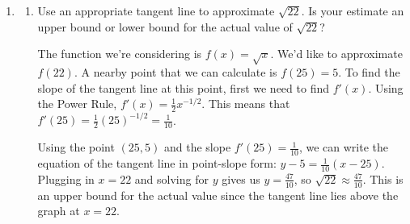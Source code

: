 \documentclass{article}
\begin{document}
\begin{enumerate}[resume, topsep=0pt]
\begin{enumerate}
    \begin{solution}
      We can differentiate this function by expanding and using the Sum, Constant Multiple,
      and Power Rules, or we can write it as $a(s)=(3s+1)(3s+1)$ and use the Product Rule.
    \end{solution}

  \item
    \begin{problem}[\stretch{0.5}]
      $b(s) = (3s + 1)^{1/2}$
    \end{problem}

    \begin{solution}
      We can't differentiate this function using the rules we've learned.
    \end{solution}

  \item
    \begin{problem}[\nstretch{0.25}]
      $c(s) = (3s + 1)^{-2}$
    \end{problem}

    \begin{solution}
      We can rewrite this function as $c(s)=\dfrac{1}{(3s+1)^2} = \dfrac{1}{9s^2 + 6s + 1}$. We can then use
      the Quotient Rule.
    \end{solution}

  \end{enumerate}

\item 

  \begin{enumerate}
  \item
    \begin{problem}[\vfill]
      Use an appropriate tangent line to approximate $\sqrt{22}$. Is your estimate an upper bound or lower bound for the actual value of $\sqrt{22}$?
    \end{problem}

    \begin{solution}
      The function we're considering is $f(x)=\sqrt{x}$. We'd like to approximate $f(22)$.
      A nearby point that we can calculate is $f(25)=5$. To find the slope of the tangent
      line at this point, first we need to find $f'(x)$. Using the Power Rule, 
      $f'(x) = \frac{1}{2}x^{-1/2}$. This means that $f'(25) = \frac{1}{2}(25)^{-1/2} = 
      \frac{1}{10}$.

      Using the point $(25, 5)$ and the slope $f'(25) = \frac{1}{10}$, we can write the
      equation of the tangent line in point-slope form: $y-5 = \frac{1}{10}(x-25)$. Plugging
      in $x=22$ and solving for $y$ gives us $y= \frac{47}{10}$, so $\sqrt{22} \approx 
      \frac{47}{10}$. This is an upper bound for the actual value since the tangent line
      lies above the graph at $x=22$. 


\end{solution}
\end{enumerate}
\end{enumerate}
\end{document}
